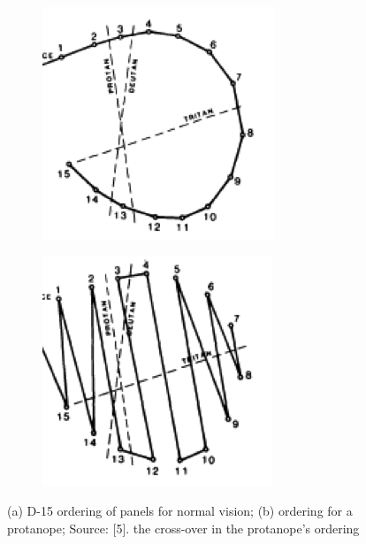 \documentclass[10pt,twocolumn,letterpaper]{article}
\begin{document}
\begin{figure}[h]
  \centering
  \begin{subfigure}{0.22\textwidth}
    \includegraphics[width=\textwidth]{luv1.png}
    \caption{}
  \end{subfigure}
  \begin{subfigure}{0.22\textwidth}
    \includegraphics[width=\textwidth]{luv2.png}
    \caption{}
  \end{subfigure}
  \caption{(a) D-15 ordering of panels for normal vision; (b) ordering for a protanope; Source: [5]. the cross-over in the protanope's ordering}
  \label{fig:luv}
\end{figure}
\end{document}
